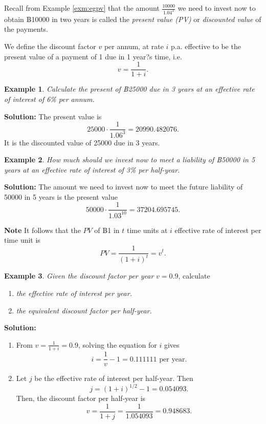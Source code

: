 \documentclass[
]{book}
\theoremstyle{definition}
\theoremstyle{definition}
\newtheorem{example}{Example}[chapter]
\theoremstyle{definition}
\theoremstyle{definition}
\theoremstyle{remark}
\begin{document}
Recall from Example \ref{exm:egpv} that the amount
\(\displaystyle{\frac{10000}{1.04^2}}\) we need to invest now to obtain
฿10000 in two years is called the \emph{present value (PV)} or \emph{discounted
value} of the payments.

We define the discount factor \(v\) per annum, at rate \(i\) p.a. effective
to be the present value of a payment of 1 due in 1 year?s time, i.e.
\[v = \frac{1}{1+i}.\]

\begin{example}
\emph{Calculate the present of ฿25000 due in 3 years at an effective rate of
interest of 6\% per annum.}
\end{example}

\textbf{Solution:} The present value is
\[25000 \cdot \frac{1}{1.06^3} = 20990.482076.\] It is the discounted
value of 25000 due in 3 years.

\begin{example}
\emph{How much should we invest now to meet a liability of ฿50000 in 5 years
at an effective rate of interest of 3\% per half-year.}
\end{example}

\textbf{Solution:} The amount we need to invest now to meet the future
liability of 50000 in 5 years is the present value
\[50000 \cdot \frac{1}{1.03^{10}} = 37204.695745.\]

\textbf{Note} It follows that the \(PV\) of ฿1 in \(t\) time units at \(i\)
effective rate of interest per time unit is
\[PV = \frac{1}{(1+i)^t} = v^t.\]

\begin{example}

\emph{Given the discount factor per year} \(v = 0.9\), calculate

\begin{enumerate}
\def\labelenumi{\arabic{enumi}.}
\item
  \emph{the effective rate of interest per year.}
\item
  \emph{the equivalent discount factor per half-year.}
\end{enumerate}

\end{example}

\textbf{Solution:}

\begin{enumerate}
\def\labelenumi{\arabic{enumi}.}
\item
  From \(\displaystyle{ v= \frac{1}{1+i} = 0.9}\), solving the equation
  for \(i\) gives \[i = \frac{1}{v} - 1 = 0.111111 \text{ per year}.\]
\item
  Let \(j\) be the effective rate of interest per half-year. Then
  \[j = (1+ i)^{1/2} -1 = 0.054093.\] Then, the discount factor per
  half-year is \[v = \frac{1}{1+j} = \frac{1}{1.054093} = 0.948683.\]
\end{enumerate}
\end{document}
